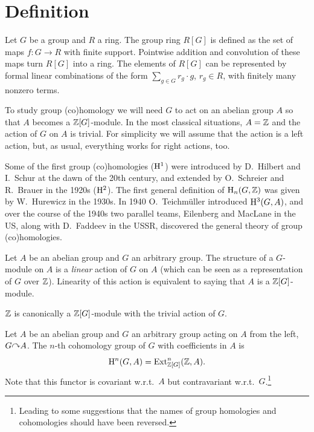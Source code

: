\section{Definition}


\begin{defn}
    Let $G$ be a group and $R$ a ring. The group ring $R[G]$ is defined as the set of maps $f:G\to R$ with finite support. Pointwise addition and convolution of these maps turn $R[G]$ into a ring. The elements of $R[G]$ can be represented by formal linear combinations of the form $\sum_{g\in G} r_g\cdot g$, $r_g\in R$, with finitely many nonzero terms.
\end{defn}

To study group (co)homology we will need $G$ to act on an abelian group $A$ so that $A$ becomes a $\mathbb{Z}[G]$-module. In the most classical situations, $A=\mathbb{Z}$ and the action of $G$ on $A$ is trivial. For simplicity we will assume that the action is a left action, but, as usual, everything works for right actions, too. 

\begin{hrem*}
    Some of the first group (co)homologies ($\mathrm{H}^1$) were introduced by D.~Hilbert and I.~Schur at the dawn of the 20th century, and extended by O.~Schreier and R.~Brauer in the 1920s ($\mathrm{H}^2$). The first general definition of $\mathrm{H}_n(G,\mathbb{Z})$ was given by W.~Hurewicz in the 1930s. In 1940 O.~Teichm\"uller introduced $\mathrm{H}^3(G,A)$, and over the course of the 1940s two parallel teams, Eilenberg and MacLane in the US, along with D.~Faddeev in the USSR, discovered the general theory of group (co)homologies.
\end{hrem*}

\begin{defn}[$G$-module]
    Let $A$ be an abelian group and $G$ an arbitrary group. The structure of a $G$-module on $A$ is a \emph{linear} action of $G$ on $A$ (which can be seen as a representation of $G$ over $\mathbb{Z}$). Linearity of this action is equivalent to saying that $A$ is a $\mathbb{Z}[G]$-module.
\end{defn}

\begin{example}
    $\mathbb{Z}$ is canonically a $\mathbb{Z}[G]$-module with the trivial action of $G$.
\end{example} 

\begin{defn}
    Let $A$ be an abelian group and $G$ an arbitrary group acting on $A$ from the left, $G\acts A$. The $n$-th cohomology group of $G$ with coefficients in $A$ is
    \[\mathrm{H}^n(G,A)=\operatorname{Ext}_{\mathbb{Z}[G]}^n(\mathbb{Z},A).\]
    Note that this functor is covariant w.r.t.\ $A$ but contravariant w.r.t.\ $G$.\footnote{Leading to some suggestions that the names of group homologies and cohomologies should have been reversed.} 
\end{defn}

